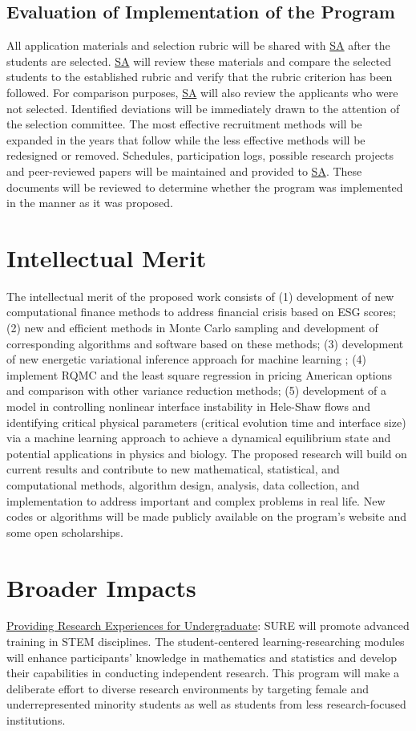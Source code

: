 \documentclass[11pt]{NSFamsart}
\newcommand{\Upara}[1]{\noindent\underline{\upshape #1}:}
\newcommand{\SA}{\hyperlink{SAlink}{SA}\xspace}
\begin{document}
\subsection{Evaluation of Implementation of the Program}
 All application materials and selection rubric will be shared
with \SA after the students are selected. \SA will review
these materials and  compare the selected students to the established
rubric and verify that the rubric criterion has been followed. For comparison purposes, \SA will also
review the applicants who were not selected. Identified deviations will be immediately drawn to the
attention of the selection committee. The most effective recruitment methods will be expanded in the
years that follow while the less effective methods will be redesigned or removed. Schedules, participation logs, possible research projects and peer-reviewed papers will be maintained and provided to \SA. These documents will be reviewed to determine whether the program was implemented in the manner
as it was proposed.
 
\section{Intellectual Merit}
The intellectual merit of the proposed work consists of (1) development of new computational finance methods to address financial crisis based on ESG scores; (2)
new and efficient methods in Monte Carlo sampling and development of corresponding algorithms and software based on these methods; (3) development of new energetic variational inference approach for machine learning ; (4) 
implement RQMC and the least square regression in pricing American options and comparison with other variance reduction methods; (5) development of a model in controlling nonlinear interface instability in Hele-Shaw flows and identifying critical physical parameters (critical evolution time and interface size) via a machine learning approach to achieve a dynamical equilibrium state and potential applications in physics and biology.
The proposed research will build on current results and contribute to new mathematical, statistical,
and computational methods, algorithm design, analysis, data collection, and implementation to address
important and complex problems in real life. New codes or algorithms will be made publicly
available on the program’s website and some open scholarships.

\section{Broader Impacts}
\begin{sloppypar}\Upara{Providing Research Experiences for Undergraduate} 
SURE will promote advanced training in STEM
disciplines. The student-centered learning-researching modules will enhance participants’ knowledge in
mathematics and statistics and develop their capabilities in conducting independent research. This program will make a deliberate effort to diverse research environments by targeting female and underrepresented minority students as well as students from less research-focused institutions. \end{sloppypar}
\end{document}
